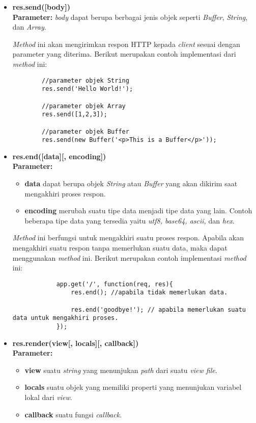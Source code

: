 \begin{itemize}
	\item \textbf{res.send([body])} \\ \textbf{Parameter:} \textit{body} dapat berupa berbagai jenis objek seperti \textit{Buffer}, \textit{String}, dan \textit{Array}.
	
	\textit{Method} ini akan mengirimkan respon HTTP kepada \textit{client} sesuai dengan parameter yang diterima. Berikut merupakan contoh implementasi dari \textit{method} ini:
	\begin{lstlisting}
		//parameter objek String
		res.send('Hello World!');
		
		//parameter objek Array
		res.send([1,2,3]);
		
		//parameter objek Buffer
		res.send(new Buffer('<p>This is a Buffer</p>'));
	\end{lstlisting}
	
	\item \textbf{res.end([data][, encoding])} \\ \textbf{Parameter:}
		\begin{itemize}
			\item \textbf{data} dapat berupa objek \textit{String} atau \textit{Buffer} yang akan dikirim saat mengakhiri proses respon.
			\item \textbf{encoding} merubah suatu tipe data menjadi tipe data yang lain. Contoh beberapa tipe data yang tersedia yaitu \textit{utf8, base64, ascii, } dan \textit{hex}.
		\end{itemize}
	
		\textit{Method} ini berfungsi untuk mengakhiri suatu proses respon. Apabila akan mengakhiri suatu respon tanpa memerlukan suatu data, maka dapat menggunakan \textit{method} ini. Berikut merupakan contoh implementasi \textit{method} ini:
		\begin{lstlisting}
			app.get('/', function(req, res){
				res.end(); //apabila tidak memerlukan data.
				
				res.end('goodbye!'); // apabila memerlukan suatu data untuk mengakhiri proses.
			});
		\end{lstlisting}
	
	\item \textbf{res.render(view[, locals][, callback])} \\ \textbf{Parameter:}
		\begin{itemize}
			\item \textbf{view} suatu \textit{string} yang menunjukan \textit{path} dari suatu \textit{view file}.
			\item \textbf{locals} suatu objek yang memiliki properti yang menunjukan variabel lokal dari \textit{view}.
			\item \textbf{callback} suatu fungsi \textit{callback}. 
		\end{itemize}
	

\end{itemize}
